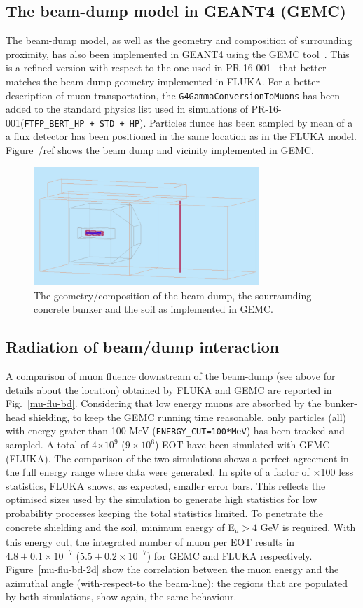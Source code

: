 \subsection{The beam-dump model in GEANT4 (GEMC)}
The beam-dump model, as well as the geometry and composition  of surrounding proximity,
 has also been implemented in GEANT4 using the GEMC tool~\cite{gemc}. This is a refined version with-respect-to the one used  in PR-16-001~\cite{bdx-proposal} that better matches the beam-dump geometry implemented in FLUKA. For a better description of  muon transportation, the {\tt G4GammaConversionToMuons} has been added to the standard physics list used in simulations of  PR-16-001({\tt FTFP\_BERT\_HP + STD + HP}).
Particles flunce has been sampled  by mean of a  a flux detector has been positioned in the same location as in the FLUKA model.
Figure~/ref{} shows the beam dump and vicinity implemented in GEMC.
\begin{figure}[h!] 
\center
\includegraphics[width=8.5cm]{figs/gemc-bd-dwns.pdf}
\caption{The geometry/composition  of the beam-dump, the sourraunding concrete bunker and  the soil as implemented in GEMC.}
\label{fig:fluka-bd-dwns}
\end{figure}
\subsection{Radiation of beam/dump interaction}
A comparison of muon fluence downstream of the beam-dump (see above for details about the location)
obtained by FLUKA and GEMC are reported in Fig.~\ref{mu-flu-bd}. Considering that low energy muons are absorbed by the bunker-head shielding, to keep the GEMC running time reasonable, only particles (all) with energy grater than 100 MeV ({\tt ENERGY\_CUT=100*MeV}) has been tracked and sampled. A total of 4$\times10^9$ ($9\times 10^6$) EOT have been simulated with GEMC (FLUKA). The comparison of the two simulations shows a perfect agreement in the full energy range where data were generated.
In spite of a factor of $\times$100  less statistics, FLUKA shows, as expected, smaller error bars. This reflects the optimised sizes used by the simulation to generate high statistics for low probability processes keeping the total statistics limited.
To penetrate  the concrete shielding and the soil,  minimum energy of  E$_\mu>4$ GeV is required. With this energy cut,   the integrated number of muon per EOT results in $4.8\pm 0.1 \times 10^{-7}$ ($5.5\pm 0.2 \times 10^{-7}$) for GEMC and FLUKA respectively.
Figure~\ref{mu-flu-bd-2d} show the correlation between the muon energy and the azimuthal angle (with-respect-to the beam-line): the regions that are populated by both simulations, show again, the same behaviour.

